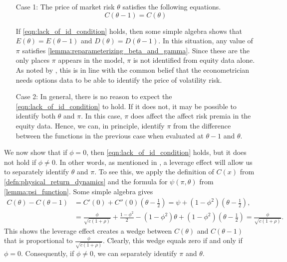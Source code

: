 \documentclass[11pt, letterpaper, twoside]{article}
\begin{document}
\begin{enumerate}
    \item[Case 1:] The price of market risk $\theta$ satisfies the following equations. 
        \begin{equation}
            \label{eqn:lack_of_id_condition}
            C(\theta - 1) = C(\theta) 
        \end{equation}
    
        If \cref{eqn:lack_of_id_condition} holds, then some simple algebra shows that $E(\theta) = E(\theta-1)$ and $D(\theta) = D(\theta-1)$.  In this situation, any value of $\pi$ satisfies \cref{lemma:reparameterizing_beta_and_gamma}.  Since these are the only places $\pi$ appears in the model, $\pi$ is not identified from equity data alone.  As noted by \textcite{han2018leverage}, this is in line with the common belief that the econometrician needs options data to be able to identify the price of volatility risk. 
    
    \item[Case 2:] 
        In general, there is no reason to expect the \cref{eqn:lack_of_id_condition} to hold.  If it does not, it may be possible to identify both $\theta$ and $\pi$.  In this case, $\pi$ does affect the affect risk premia in the equity data. Hence, we can, in principle, identify $\pi$ from the difference between the functions in the previous case when evaluated at $\theta-1$ and $\theta$.  
\end{enumerate}

We now show that if $\phi = 0$, then \cref{eqn:lack_of_id_condition} holds, but it does not hold if $\phi \neq 0$. In other words, as mentioned in \textcite[13]{han2018leverage}, a leverage effect will allow us to separately identify $\theta$ and $\pi$. To see this, we apply the definition of $C(x)$ from \cref{defn:physical_return_dynamics} and the formula for $\psi(\pi, \theta)$ from \cref{lemma:psi_function}. Some simple algebra gives 
%
\begin{align}
    C(\theta) - C(\theta - 1) &= C'(0) + C''(0) \left(\theta - \frac{1}{2}\right) = \psi + (1 - \phi^2) \left(\theta - \frac{1}{2}\right), \\
%
    &= \frac{\phi}{\sqrt{c (1 + \rho )}} + \frac{1 - \phi^2}{2} - (1 - \phi^2) \theta + (1 - \phi^2) \left(\theta - \frac{1}{2}\right) 
%
    \label{eqn:alpha_difference} 
    = \frac{\phi}{\sqrt{c (1 + \rho )}}. 
\end{align}
%
This shows the leverage effect creates a wedge between $C(\theta)$ and $C(\theta-1)$ that is proportional to $\frac{\phi}{\sqrt{c (1 + \rho )}}$. Clearly, this wedge equals zero if and only if $\phi = 0$. Consequently, if $\phi \neq 0$, we can separately identify $\pi$ and $\theta$.
\end{document}
